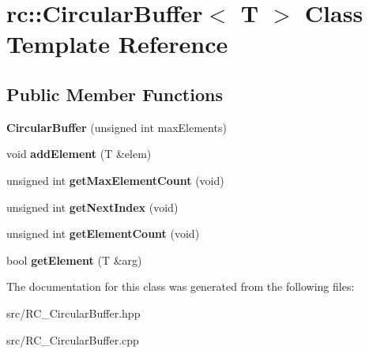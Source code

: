 \hypertarget{classrc_1_1CircularBuffer}{\section{rc\+:\+:Circular\+Buffer$<$ T $>$ Class Template Reference}
\label{classrc_1_1CircularBuffer}
}
\subsection*{Public Member Functions}
\begin{DoxyCompactItemize}
\item 
\hypertarget{classrc_1_1CircularBuffer_af0abd0737caf863845860418e36cee61}{{\bfseries Circular\+Buffer} (unsigned int max\+Elements)}\label{classrc_1_1CircularBuffer_af0abd0737caf863845860418e36cee61}

\item 
\hypertarget{classrc_1_1CircularBuffer_aa03a62fe9deae36e5b83200f9f7a2c24}{void {\bfseries add\+Element} (T \&elem)}\label{classrc_1_1CircularBuffer_aa03a62fe9deae36e5b83200f9f7a2c24}

\item 
\hypertarget{classrc_1_1CircularBuffer_ae4194d665b35b6a86444f54c759878b7}{unsigned int {\bfseries get\+Max\+Element\+Count} (void)}\label{classrc_1_1CircularBuffer_ae4194d665b35b6a86444f54c759878b7}

\item 
\hypertarget{classrc_1_1CircularBuffer_a07d170b88c762967442b90ef2a4848fa}{unsigned int {\bfseries get\+Next\+Index} (void)}\label{classrc_1_1CircularBuffer_a07d170b88c762967442b90ef2a4848fa}

\item 
\hypertarget{classrc_1_1CircularBuffer_a1bb2a9a349df4e9b8e213434725c8b8f}{unsigned int {\bfseries get\+Element\+Count} (void)}\label{classrc_1_1CircularBuffer_a1bb2a9a349df4e9b8e213434725c8b8f}

\item 
\hypertarget{classrc_1_1CircularBuffer_a4ef798c56ada44df67cc4bb5ae1a08eb}{bool {\bfseries get\+Element} (T \&arg)}\label{classrc_1_1CircularBuffer_a4ef798c56ada44df67cc4bb5ae1a08eb}

\end{DoxyCompactItemize}


The documentation for this class was generated from the following files\+:\begin{DoxyCompactItemize}
\item 
src/R\+C\+\_\+\+Circular\+Buffer.\+hpp\item 
src/R\+C\+\_\+\+Circular\+Buffer.\+cpp\end{DoxyCompactItemize}
